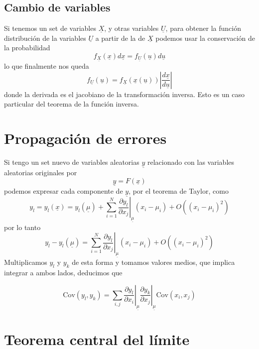 \documentclass{article}
\numberwithin{equation}{section} %
\begin{document}
\subsection{Cambio de variables}
Si tenemos un set de variables $\underline{X}$, y otras variables $\underline{U}$, para obtener la función distribución de la variables $\underline{U}$ a partir de la de $\underline{X}$ podemos usar la conservación de la probabilidad
\begin{equation}
f_{\underline{X}}(\underline{x}) d\underline{x} = f_{\underline{U}}(\underline{u}) d\underline{u}
\end{equation}
lo que finalmente nos queda
\begin{equation}
f_{\underline{U}}(\underline{u}) = f_{\underline{X}}(\underline{x}(\underline{u})) \left|\frac{d \underline{x}}{d \underline{u}}\right|
\end{equation}
donde la derivada es el jacobiano de la transformación inversa. Esto es un caso particular del teorema de la función inversa.
\section{Propagación de errores}
Si tengo un set nuevo de variables aleatorias $\underline{y}$ relacionado con las variables aleatorias originales por
\begin{equation}
\underline{y} = F(\underline{x})
\end{equation}
podemos expresar cada componente de $\underline{y}$, por el teorema de Taylor, como 
\[y_l = y_l(\underline{x}) = y_l(\underline{\mu}) + \sum_{i = 1}^{N} \left.\frac{\partial y_l}{\partial x_j}\right|_{\underline{\mu}} (x_i - \mu_i) + O((x_i - \mu_i)^2)\]
por lo tanto
\[y_l - y_l(\underline{\mu}) = \sum_{i = 1}^{N} \left.\frac{\partial y_l}{\partial x_j}\right|_{\underline{\mu}} (x_i - \mu_i) + O((x_i - \mu_i)^2)\]
Multiplicamos $y_l$ y $y_k$ de esta forma y tomamos valores medios, que implica integrar a ambos lados, deducimos que

\begin{equation}
\text{Cov}(y_l,y_k) = \sum_{i,j}  \left.\frac{\partial y_l}{\partial x_i}\right|_{\underline{\mu}}  \left.\frac{\partial y_k}{\partial x_j}\right|_{\underline{\mu}}  \text{Cov}(x_i,x_j)
\end{equation}

\section{Teorema central del límite}
\end{document}
